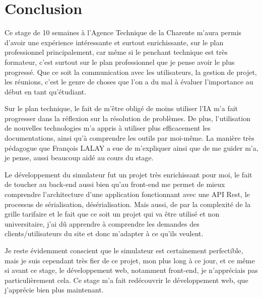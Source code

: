 \documentclass[a4paper,12pt]{report}
\begin{document}
\chapter{Conclusion}

Ce stage de 10 semaines à l'Agence Technique de la Charente m'aura permis d'avoir une expérience intéressante et surtout enrichissante, sur le plan professionnel principalement, car même si le penchant technique est très formateur, c'est surtout sur le plan professionnel que je pense avoir le plus progressé. Que ce soit la communication avec les utilisateurs, la gestion de projet, les réunions, c'est le genre de choses que l'on a du mal à évaluer l'importance au début en tant qu'étudiant.

\vspace{1em}

Sur le plan technique, le fait de m'être obligé de moins utiliser l'IA m'a fait progresser dans la réflexion sur la résolution de problèmes. De plus, l'utilisation de nouvelles technologies m'a appris à utiliser plus efficacement les documentations, ainsi qu'à comprendre les outils par moi-même. La manière très pédagogue que François LALAY a eue de m'expliquer ainsi que de me guider m'a, je pense, aussi beaucoup aidé au cours du stage.

\vspace{1em}

Le développement du simulateur fut un projet très enrichissant pour moi, le fait de toucher au back-end aussi bien qu'au front-end me permet de mieux comprendre l'architecture d'une application fonctionnant avec une API Rest, le processus de sérialisation, désérialisation. Mais aussi, de par la complexité de la grille tarifaire et le fait que ce soit un projet qui va être utilisé et non universitaire, j'ai dû apprendre à comprendre les demandes des clients/utilisateurs du site et donc m'adapter à ce qu'ils veulent.

\vspace{1em}

Je reste évidemment conscient que le simulateur est certainement perfectible, mais je suis cependant très fier de ce projet, mon plus long à ce jour, et ce même si avant ce stage, le développement web, notamment front-end, je n'appréciais pas particulièrement cela. Ce stage m'a fait redécouvrir le développement web, que j'apprécie bien plus maintenant.
\end{document}
